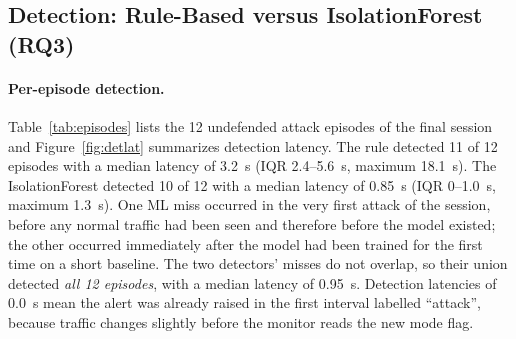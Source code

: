 \subsection{Detection: Rule-Based versus IsolationForest (RQ3)}
\label{sec:det-results}

\paragraph{Per-episode detection.} Table~\ref{tab:episodes} lists the 12 undefended
attack episodes of the final session and Figure~\ref{fig:detlat} summarizes detection
latency. The rule detected 11 of 12 episodes with a median latency of 3.2~s (IQR
2.4--5.6~s, maximum 18.1~s). The IsolationForest detected 10 of 12 with a median
latency of 0.85~s (IQR 0--1.0~s, maximum 1.3~s). One ML miss occurred in the very first
attack of the session, before any normal traffic had been seen and therefore before
the model existed; the other occurred immediately after the model had been trained
for the first time on a short baseline. The two detectors' misses do not overlap, so
their union detected \emph{all 12 episodes}, with a median latency of 0.95~s.
Detection latencies of 0.0~s mean the alert was already raised in the first interval
labelled ``attack'', because traffic changes slightly before the monitor reads the new
mode flag.

